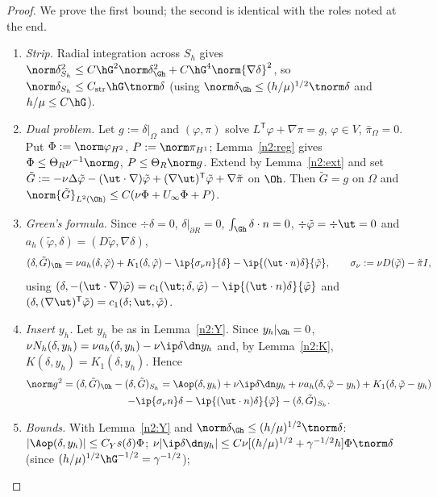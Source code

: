 \begin{proof}
We prove the first bound; the second is identical with the roles noted at the end.
\begin{enumerate}
\item \emph{Strip.} Radial integration across $S_h$ gives $\norm\delta^2_{S_h}\le C\hG^2\norm\delta^2_{\Gh}+C\hG^4\norm{\nabla\delta}^2$, so
$\norm\delta_{S_h}\le C_{\rm str}\hG\tnorm\delta$ (using $\norm\delta_{\Gh}\le(h/\mu)^{1/2}\tnorm\delta$ and $h/\mu\le C\hG$).
\item \emph{Dual problem.} Let $g:=\delta|_\Omega$ and $(\varphi,\pi)$ solve $L^{\mathsf T}\varphi+\nabla\pi=g$, $\varphi\in V$, $\bar\pi_\Omega=0$.
Put $\Phi:=\norm\varphi_{H^2}$, $P:=\norm\pi_{H^1}$; Lemma~\ref{n2:reg} gives $\Phi\le\Theta_R\nu^{-1}\norm g$, $P\le\Theta_R\norm g$.
Extend by Lemma~\ref{n2:ext} and set $\tilde G:=-\nu\Delta\tilde\varphi-(\ut\cdot\nabla)\tilde\varphi+(\nabla\ut)^{\mathsf T}\tilde\varphi+\nabla\tilde\pi$ on $\Oh$.
Then $\tilde G=g$ on $\Omega$ and $\norm{\tilde G}_{L^2(\Oh)}\le C(\nu\Phi+U_\infty\Phi+P)$.
\item \emph{Green's formula.} Since $\div\delta=0$, $\delta|_{\partial R}=0$, $\int_{\Gh}\delta\cdot n=0$, $\div\tilde\varphi=\div\ut=0$ and
$a_h(\tilde\varphi,\delta)=(D\tilde\varphi,\nabla\delta)$,
\[
(\delta,\tilde G)_{\Oh}=\nu a_h(\delta,\tilde\varphi)+K_1(\delta,\tilde\varphi)-\ip{\sigma_\nu n}{\delta}-\ip{(\ut\cdot n)\delta}{\tilde\varphi},\qquad
\sigma_\nu:=\nu D(\tilde\varphi)-\tilde\pi I ,
\]
using $(\delta,-(\ut\cdot\nabla)\tilde\varphi)=c_1(\ut;\delta,\tilde\varphi)-\ip{(\ut\cdot n)\delta}{\tilde\varphi}$ and $(\delta,(\nabla\ut)^{\mathsf T}\tilde\varphi)=c_1(\delta;\ut,\tilde\varphi)$.
\item \emph{Insert $y_h$.} Let $y_h$ be as in Lemma~\ref{n2:Y}. Since $y_h|_{\Gh}=0$, $\nu N_h(\delta,y_h)=\nu a_h(\delta,y_h)-\nu\ip\delta{\dn y_h}$ and,
by Lemma~\ref{n2:K}, $K(\delta,y_h)=K_1(\delta,y_h)$. Hence
\begin{multline*}
\norm g^2=(\delta,\tilde G)_{\Oh}-(\delta,\tilde G)_{S_h}
=\Aop(\delta,y_h)+\nu\ip\delta{\dn y_h}+\nu a_h(\delta,\tilde\varphi-y_h)+K_1(\delta,\tilde\varphi-y_h)\\
-\ip{\sigma_\nu n}\delta-\ip{(\ut\cdot n)\delta}{\tilde\varphi}-(\delta,\tilde G)_{S_h}.
\end{multline*}
\item \emph{Bounds.} With Lemma~\ref{n2:Y} and $\norm\delta_{\Gh}\le(h/\mu)^{1/2}\tnorm\delta$:
$|\Aop(\delta,y_h)|\le C_Ys(\delta)\Phi$;
$\nu|\ip\delta{\dn y_h}|\le C\nu[(h/\mu)^{1/2}+\gamma^{-1/2}h]\Phi\tnorm\delta$ (since $(h/\mu)^{1/2}\hG^{-1/2}=\gamma^{-1/2}$);

\end{enumerate}
\end{proof}

